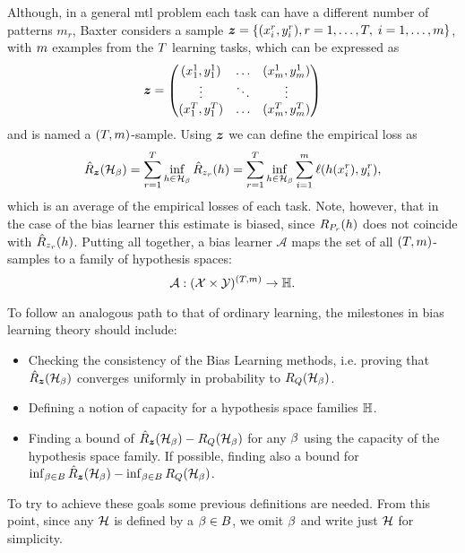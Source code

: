 Although, in a general \acrshort{mtl} problem each task can have a different number of patterns $m_r$, Baxter considers a sample $\bm{z}=\{(x_i^r, y_i^r), r=1, \ldots, T, \; i=1, \ldots, m \}$, with $m$ examples from the $T$ learning tasks, which can be expressed as
\begin{equation}
    \nonumber
    \bm{z} = 
    \begin{pmatrix}
        (x_1^1, y_1^1) & \ldots & (x_m^1, y_m^1) \\
        \vdots & \ddots & \vdots \\
        (x_1^T, y_1^T) & \ldots & (x_m^T, y_m^T) \\
    \end{pmatrix}
\end{equation}
and is named a $(T, m)$-sample.
Using $\bm{z}$ we can define the empirical loss as
\begin{equation}\label{eq:biaslearn_emprisk}
    \bemprisk(\hypspace_\fparam) = \sum_{r=1}^\ntasks \inf_{\hypf \in \hypspace_\fparam} \hat{\risk}_{\sample_r}(\hypf) = \sum_{r=1}^\ntasks \inf_{\hypf \in \hypspace_\fparam} \sum_{i=1}^m \lossf(\hypf(x_i^r), y_i^r),
\end{equation}
which is an average of the empirical losses of each task. 
Note, however, that in the case of the bias learner this estimate is biased, since $R_{P_r}(h)$ does not coincide with $\hat{R}_{z_r}(h)$. 
Putting all together, a bias learner $\mathcal{A}$ maps the set of all $(T, m)$-samples to a family of hypothesis spaces:
\begin{equation}
    \nonumber
    \mathcal{A} : {(\mathcal{X} \times \mathcal{Y})^{(T, m)}} \to \mathbb{H}.
\end{equation}
%

To follow an analogous path to that of ordinary learning, the milestones in bias learning theory should include:
\begin{itemize}
    \item Checking the consistency of the Bias Learning methods, i.e. proving that $\hat{R}_{\bm{z}}(\mathcal{H}_\beta)$ converges uniformly in probability to $R_Q(\mathcal{H}_\beta)$.
    \item Defining a notion of capacity for a hypothesis space families $\mathbb{H}$.
    \item Finding a bound of $\hat{R}_{\bm{z}}(\mathcal{H}_\beta) - R_Q(\mathcal{H}_\beta)$ for any $\beta$ using the capacity of the hypothesis space family. If possible, finding also a bound for $\inf_{\beta \in B}\hat{R}_{\bm{z}}(\mathcal{H}_\beta) - \inf_{\beta \in B} R_Q(\mathcal{H}_\beta)$.
\end{itemize}
To try to achieve these goals some previous definitions are needed. From this point, since any $\mathcal{H}$ is defined by a $\beta \in B$, we omit $\beta$ and write just $\mathcal{H}$ for simplicity.
%
